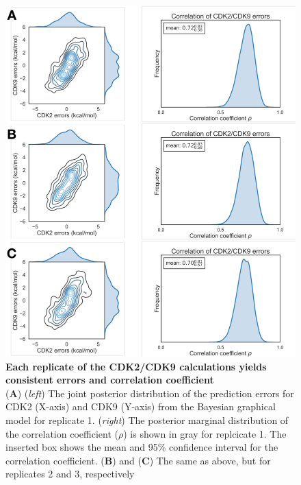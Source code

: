 \documentclass[phd,tocprelim]{cornell}
\begin{document}
\begin{appendices}
	\begin{landscape}
		\begin{figure}[p]
			\centering
			\includegraphics[width=0.48\linewidth]{figures/supp_figure5.pdf}
			\caption[Each replicate of the CDK2/CDK9 calculations yields consistent errors and correlation coefficient]{
				{\bf Each replicate of the CDK2/CDK9 calculations yields consistent errors and correlation coefficient} \\
				({\bf A}) (\emph{left}) The joint posterior distribution of the prediction errors for CDK2 (X-axis) and CDK9 (Y-axis) from the Bayesian graphical model for replicate 1. (\emph{right}) The posterior marginal distribution of the correlation coefficient ($\rho$) is shown in gray for replcicate 1. The inserted box shows the mean and 95\% confidence interval for the correlation coefficient. ({\bf B}) and ({\bf C}) The same as above, but for replicates 2 and 3, respectively
			}
			\label{fig:sup-figure-5}
		\end{figure}
	\end{landscape}
	

\end{appendices}
\end{document}
